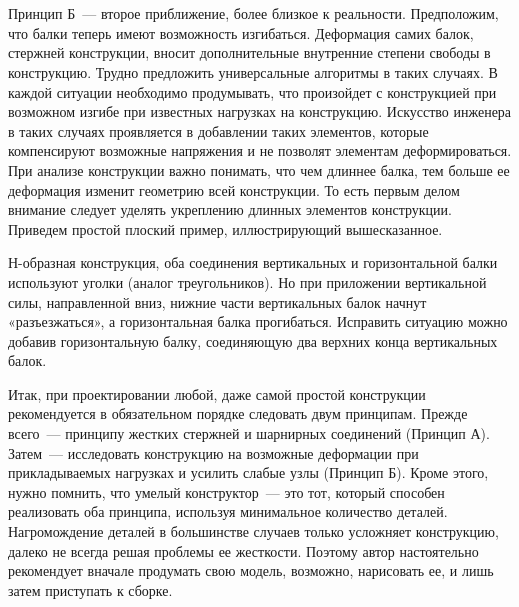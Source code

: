 {\hypertarget{lesson19x4}{}}\\\\

Принцип Б~--- второе приближение, более близкое к реальности. Предположим, что балки теперь имеют возможность изгибаться. Деформация самих балок, стержней конструкции, вносит дополнительные внутренние степени свободы в конструкцию. Трудно предложить универсальные алгоритмы в таких случаях. В каждой ситуации необходимо продумывать, что произойдет с конструкцией при возможном изгибе при известных нагрузках на конструкцию. Искусство инженера в таких случаях проявляется в добавлении таких элементов, которые компенсируют возможные напряжения и не позволят элементам деформироваться. При анализе конструкции важно понимать, что чем длиннее балка, тем больше ее деформация изменит геометрию всей конструкции. То есть первым делом внимание следует уделять укреплению длинных элементов конструкции. Приведем простой плоский пример, иллюстрирующий вышесказанное. 

Н-образная конструкция, оба соединения вертикальных и горизонтальной балки используют уголки (аналог треугольников). Но при приложении вертикальной силы, направленной вниз, нижние части вертикальных балок начнут «разъезжаться», а горизонтальная балка прогибаться. Исправить ситуацию можно добавив горизонтальную балку, соединяющую два верхних конца вертикальных балок.

Итак, при проектировании любой, даже самой простой конструкции рекомендуется в обязательном порядке следовать двум принципам. Прежде всего~--- принципу жестких стержней и шарнирных соединений (Принцип А). Затем~--- исследовать конструкцию на возможные деформации при прикладываемых нагрузках и усилить слабые узлы (Принцип Б). Кроме этого, нужно помнить, что умелый конструктор~--- это тот, который способен реализовать оба принципа, используя минимальное количество деталей. Нагромождение деталей в большинстве случаев только усложняет конструкцию, далеко не всегда решая проблемы ее жесткости. Поэтому автор настоятельно рекомендует вначале продумать свою модель, возможно, нарисовать ее, и лишь затем приступать к сборке.\\\\

{\hypertarget{lesson19x5}{}}\\\\

